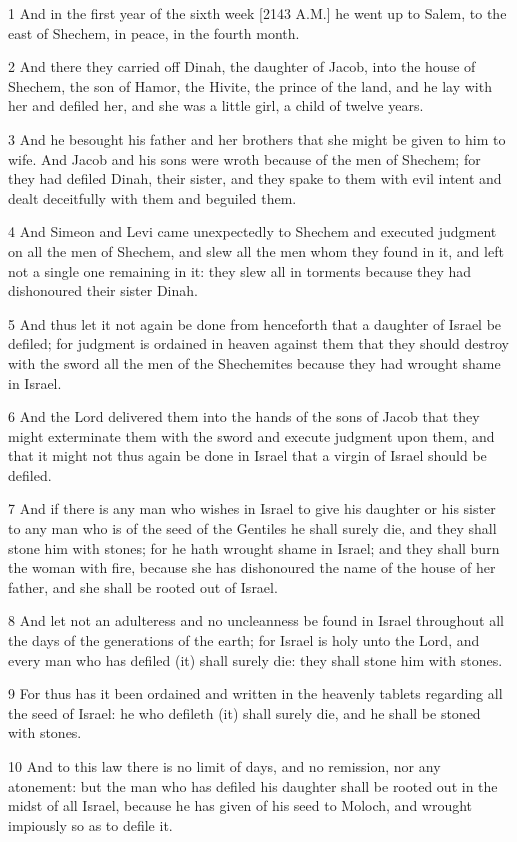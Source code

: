 \par 1 And in the first year of the sixth week [2143 A.M.] he went up to Salem, to the east of Shechem, in peace, in the fourth month.
\par 2 And there they carried off Dinah, the daughter of Jacob, into the house of Shechem, the son of Hamor, the Hivite, the prince of the land, and he lay with her and defiled her, and she was a little girl, a child of twelve years.
\par 3 And he besought his father and her brothers that she might be given to him to wife. And Jacob and his sons were wroth because of the men of Shechem; for they had defiled Dinah, their sister, and they spake to them with evil intent and dealt deceitfully with them and beguiled them.
\par 4 And Simeon and Levi came unexpectedly to Shechem and executed judgment on all the men of Shechem, and slew all the men whom they found in it, and left not a single one remaining in it: they slew all in torments because they had dishonoured their sister Dinah.
\par 5 And thus let it not again be done from henceforth that a daughter of Israel be defiled; for judgment is ordained in heaven against them that they should destroy with the sword all the men of the Shechemites because they had wrought shame in Israel.
\par 6 And the Lord delivered them into the hands of the sons of Jacob that they might exterminate them with the sword and execute judgment upon them, and that it might not thus again be done in Israel that a virgin of Israel should be defiled.
\par 7 And if there is any man who wishes in Israel to give his daughter or his sister to any man who is of the seed of the Gentiles he shall surely die, and they shall stone him with stones; for he hath wrought shame in Israel; and they shall burn the woman with fire, because she has dishonoured the name of the house of her father, and she shall be rooted out of Israel.
\par 8 And let not an adulteress and no uncleanness be found in Israel throughout all the days of the generations of the earth; for Israel is holy unto the Lord, and every man who has defiled (it) shall surely die: they shall stone him with stones.
\par 9 For thus has it been ordained and written in the heavenly tablets regarding all the seed of Israel: he who defileth (it) shall surely die, and he shall be stoned with stones.
\par 10 And to this law there is no limit of days, and no remission, nor any atonement: but the man who has defiled his daughter shall be rooted out in the midst of all Israel, because he has given of his seed to Moloch, and wrought impiously so as to defile it.
